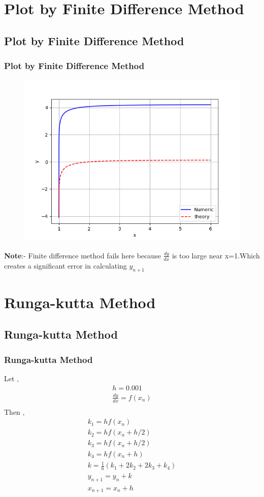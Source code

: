 \documentclass{beamer}
\providecommand{\brak}[1]{\ensuremath{\left(#1\right)}}
\theoremstyle{remark}
\numberwithin{equation}{section}
\begin{document}
\section{Plot by Finite Difference Method}
\subsection{Plot by Finite Difference Method}
\begin{frame}
\frametitle{Plot by Finite Difference Method}


\begin{figure}[h!]
   \centering
   \includegraphics[width=0.7\linewidth]{figs/Figure_2.png}
   \label{Graph by Finite difference Method}
\end{figure}
\textbf{Note}:- Finite difference method fails here because $\frac{dy}{dx}$ is too large near x=1.Which creates a significant error in calculating $y_{n+1}$
\end{frame}

\section{Runga-kutta Method}
\subsection{Runga-kutta Method}
\begin{frame}
\frametitle{Runga-kutta Method}

Let ,
\begin{align} 
	h=0.001 \\
	\frac{dy}{dx} = f\brak{x_n} \\
\end{align}
Then ,
\begin{align} 
	k_1 = hf\brak{x_n}\\
	k_2 = hf\brak{x_n + h/2}\\
	k_3 = hf\brak{x_n + h/2}\\
	k_4 = hf\brak{x_n + h}\\
	k = \frac{1}{6}\brak{k_1 + 2k_2 + 2k_3+k_4}\\
	y_{n+1} = y_n + k\\
	x_{n+1} = x_{n} + h 
\end{align}
\end{frame}
\end{document}
